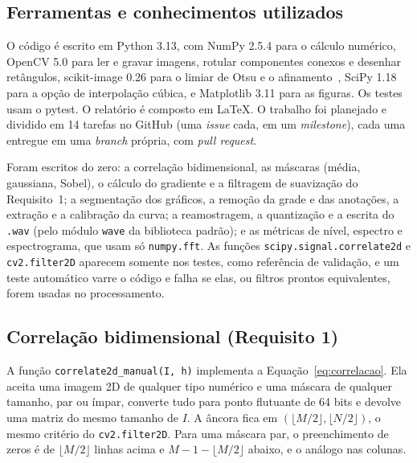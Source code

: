 \subsection{Ferramentas e conhecimentos utilizados}

O código é escrito em Python 3.13, com NumPy 2.5.4 para o cálculo numérico, OpenCV 5.0 para ler e gravar imagens, rotular componentes conexos e desenhar retângulos, scikit-image 0.26 para o limiar de Otsu e o afinamento~\cite{otsu1979,lee1994}, SciPy 1.18 para a opção de interpolação cúbica, e Matplotlib 3.11 para as figuras. Os testes usam o pytest. O relatório é composto em \LaTeX. O trabalho foi planejado e dividido em 14 tarefas no GitHub (uma \emph{issue} cada, em um \emph{milestone}), cada uma entregue em uma \emph{branch} própria, com \emph{pull request}.

Foram escritos do zero: a correlação bidimensional, as máscaras (média, gaussiana, Sobel), o cálculo do gradiente e a filtragem de suavização do Requisito~1; a segmentação dos gráficos, a remoção da grade e das anotações, a extração e a calibração da curva; a reamostragem, a quantização e a escrita do \texttt{.wav} (pelo módulo \texttt{wave} da biblioteca padrão); e as métricas de nível, espectro e espectrograma, que usam só \texttt{numpy.fft}. As funções \texttt{scipy.signal.correlate2d} e \texttt{cv2.filter2D} aparecem somente nos testes, como referência de validação, e um teste automático varre o código e falha se elas, ou filtros prontos equivalentes, forem usadas no processamento.

\subsection{Correlação bidimensional (Requisito 1)}

A função \texttt{correlate2d\_manual(I, h)} implementa a Equação~\ref{eq:correlacao}. Ela aceita uma imagem 2D de qualquer tipo numérico e uma máscara de qualquer tamanho, par ou ímpar, converte tudo para ponto flutuante de 64 bits e devolve uma matriz do mesmo tamanho de $I$. A âncora fica em $(\lfloor M/2\rfloor,\lfloor N/2\rfloor)$, o mesmo critério do \texttt{cv2.filter2D}. Para uma máscara par, o preenchimento de zeros é de $\lfloor M/2\rfloor$ linhas acima e $M-1-\lfloor M/2\rfloor$ abaixo, e o análogo nas colunas.

